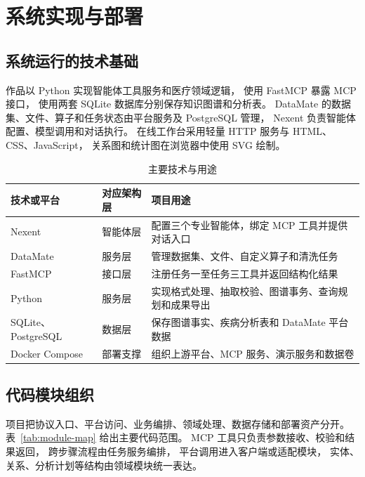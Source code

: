 \chapter{系统实现与部署}

\section{系统运行的技术基础}

作品以 Python 实现智能体工具服务和医疗领域逻辑，
使用 FastMCP 暴露 MCP 接口，
使用两套 SQLite 数据库分别保存知识图谱和分析表。
DataMate 的数据集、文件、算子和任务状态由平台服务及 PostgreSQL 管理，
Nexent 负责智能体配置、模型调用和对话执行。
在线工作台采用轻量 HTTP 服务与 HTML、CSS、JavaScript，
关系图和统计图在浏览器中使用 SVG 绘制。

\begin{table}[H]
\centering
\caption{主要技术与用途}
\label{tab:technology-stack}
\begin{tabularx}{\textwidth}{L{3.2cm}L{4.0cm}Y}
\toprule
\textbf{技术或平台} & \textbf{对应架构层} & \textbf{项目用途} \\
\midrule
Nexent & 智能体层 &
配置三个专业智能体，绑定 MCP 工具并提供对话入口 \\
\addlinespace
DataMate & 服务层 &
管理数据集、文件、自定义算子和清洗任务 \\
\addlinespace
FastMCP & 接口层 &
注册任务一至任务三工具并返回结构化结果 \\
\addlinespace
Python & 服务层 &
实现格式处理、抽取校验、图谱事务、查询规划和成果导出 \\
\addlinespace
SQLite、PostgreSQL & 数据层 &
保存图谱事实、疾病分析表和 DataMate 平台数据 \\
\addlinespace
Docker Compose & 部署支撑 &
组织上游平台、MCP 服务、演示服务和数据卷 \\
\bottomrule
\end{tabularx}
\end{table}

\section{代码模块组织}

项目把协议入口、平台访问、业务编排、领域处理、数据存储和部署资产分开。
表~\ref{tab:module-map} 给出主要代码范围。
MCP 工具只负责参数接收、校验和结果返回，
跨步骤流程由任务服务编排，
平台调用进入客户端或适配模块，
实体、关系、分析计划等结构由领域模块统一表达。

